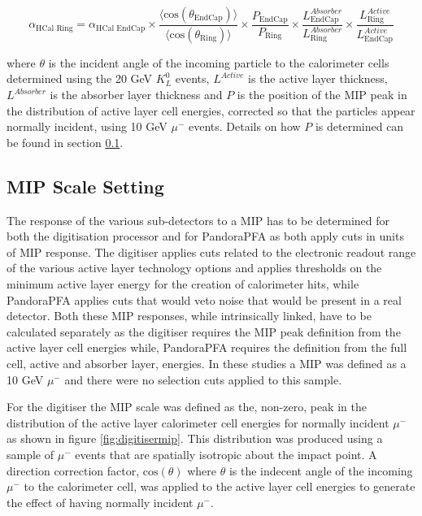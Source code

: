 \begin{equation}
\alpha_{\text{HCal Ring}} = \alpha_{\text{HCal EndCap}} \times \frac{\langle \text{cos}(\theta_\text{EndCap}) \rangle}{\langle \text{cos}(\theta_\text{Ring}) \rangle} \times \frac{P_\text{EndCap} }{P_\text{Ring} } \times \frac{L^{Absorber}_\text{EndCap}}{L^{Absorber}_\text{Ring} } \times \frac{L^{Active}_\text{Ring}}{L^{Active}_\text{EndCap}}
\end{equation}

where $\theta$ is the incident angle of the incoming particle to the calorimeter cells determined using the 20 GeV $K^{0}_{L}$ events, $L^{Active}$ is the active layer thickness, $L^{Absorber}$ is the absorber layer thickness and $P$ is the position of the MIP peak in the distribution of active layer cell energies, corrected so that the particles appear normally incident, using 10 GeV $\mu^{-}$ events.  Details on how $P$ is determined can be found in section \ref{sec:mipresponse}.


\subsection{MIP Scale Setting}
\label{sec:mipresponse}
The response of the various sub-detectors to a MIP has to be determined for both the digitisation processor and for PandoraPFA as both apply cuts in units of MIP response.  The digitiser applies cuts related to the electronic readout range of the various active layer technology options and applies thresholds on the minimum active layer energy for the creation of calorimeter hits, while PandoraPFA applies cuts that would veto noise that would be present in a real detector.  Both these MIP responses, while intrinsically linked, have to be calculated separately as the digitiser requires the MIP peak definition from the active layer cell energies while, PandoraPFA requires the definition from the full cell, active and absorber layer, energies.  In these studies a MIP was defined as a 10 GeV $\mu^{-}$ \cite{Bichsel:2004ej} and there were no selection cuts applied to this sample.  

For the digitiser the MIP scale was defined as the, non-zero, peak in the distribution of the active layer calorimeter cell energies for normally incident $\mu^{-}$ as shown in figure \ref{fig:digitisermip}.  This distribution was produced using a sample of $\mu^{-}$ events that are spatially isotropic about the impact point.  A direction correction factor, $\text{cos}(\theta)$ where $\theta$ is the indecent angle of the incoming $\mu^{-}$ to the calorimeter cell, was applied to the active layer cell energies to generate the effect of having normally incident $\mu^{-}$.  

